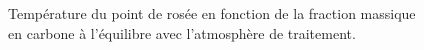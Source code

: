 \begin{figure}[!ht]
  \centering
  \hfill

  \caption{\label{fig:dew_point}Température du point de rosée en fonction de la fraction massique en carbone à l'équilibre avec l'atmosphère de traitement.}
\end{figure}

